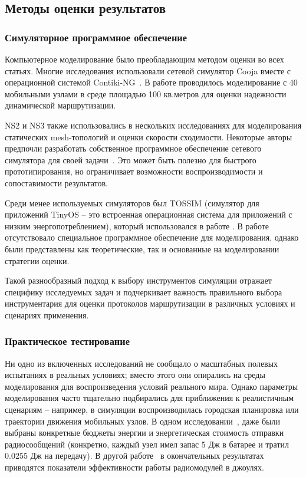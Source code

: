 \documentclass[%
]{report}
\begin{document}
\subsection{Методы оценки результатов}\label{measuring-outcomes}

\subsubsection{Симуляторное программное обеспечение}\label{simulator-software}

Компьютерное моделирование было преобладающим
методом оценки во всех статьях. Многие
исследования использовали сетевой симулятор
Cooja вместе с операционной системой Contiki-NG~\cite{HECK2025110364,KRENTZ202457}.
В работе \textcite{SHARMA2013416} проводилось
моделирование с 40 мобильными узлами в среде
площадью 100 кв.метров для оценки
надежности динамической маршрутизации.

NS2 и NS3 также использовались в
нескольких исследованиях для моделирования
статических mesh-топологий и оценки скорости
сходимости. Некоторые авторы предпочли разработать
собственное программное обеспечение сетевого симулятора
для своей задачи~\cite{PAN2012952}.
Это может быть полезно для быстрого прототипирования,
но ограничивает возможности воспроизводимости и сопоставимости
результатов.

Среди менее используемых симуляторов был TOSSIM
(симулятор для приложений TinyOS -- это встроенная операционная
система для приложений с низким энергопотреблением),
который использовался в работе
\textcite{KAFI2014181}.
В работе \textcite{ALVAREZ2008240}
отсутствовало специальное программное обеспечение
для моделирования, однако были представлены
как теоретические, так и основанные
на моделировании стратегии оценки.

Такой разнообразный подход к выбору инструментов
симуляции отражает специфику исследуемых задач и
подчеркивает важность правильного выбора инструментария
для оценки протоколов маршрутизации в различных
условиях и сценариях применения.

\subsubsection{Практическое тестирование}\label{field-testing}

Ни одно из включенных исследований
не сообщало о масштабных полевых испытаниях
в реальных условиях; вместо этого они опирались
на среды моделирования для воспроизведения условий реального мира.
Однако параметры моделирования часто тщательно
подбирались для приближения к реалистичным сценариям --
например, в симуляции воспроизводилась
городская планировка
или траектории движения мобильных узлов.
В одном исследовании~\cite{VENKATESHA201537},
даже были выбраны конкретные бюджеты энергии
и энергетическая стоимость отправки радиосообщений
(конкретно, каждый узел имел запас 5 Дж в батарее
и тратил 0.0255 Дж на передачу).
В другой работе~\cite{KRISHNA2016817}
в окончательных результатах приводятся показатели
эффективности работы радиомодулей в джоулях.
\end{document}
